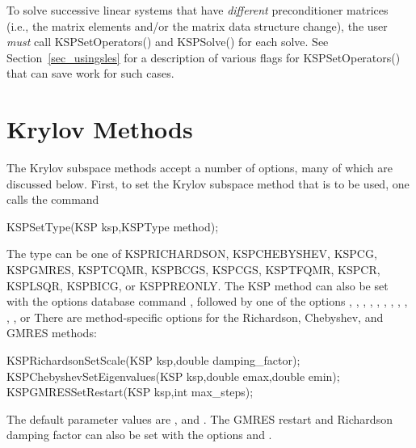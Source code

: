 To solve successive linear systems that have {\em different}
preconditioner matrices (i.e., the matrix elements and/or the matrix
data structure change), the user {\em must} call
KSPSetOperators() and KSPSolve() for each solve.  See
Section~\ref{sec_usingsles} for a description of various flags for
KSPSetOperators() that can save work for such cases.

\section{Krylov Methods}
\label{sec_ksp}

The Krylov subspace methods accept a number of options, many of which
are discussed below.  First, to set the Krylov subspace method that is to
be used, one calls the command
\begin{tabbing}
  KSPSetType(KSP ksp,KSPType method);
\end{tabbing}
The type can be one of KSPRICHARDSON, KSPCHEBYSHEV, KSPCG, KSPGMRES,
KSPTCQMR, KSPBCGS, KSPCGS, KSPTFQMR, KSPCR, KSPLSQR, KSPBICG, or KSPPREONLY.
The KSP method can also be set with the options database command
,
followed by one of the options , , , , ,
, , , , , , or  
There are method-specific options for the Richardson, Chebyshev,
and GMRES methods:  
\begin{tabbing}
  KSPRichardsonSetScale(KSP ksp,double damping\_factor);\\
  KSPChebyshevSetEigenvalues(KSP ksp,double emax,double emin);\\
  KSPGMRESSetRestart(KSP ksp,int max\_steps);
\end{tabbing}
The default parameter values are , and . The GMRES
 restart and Richardson damping factor
can also be set with the options 
and . 

